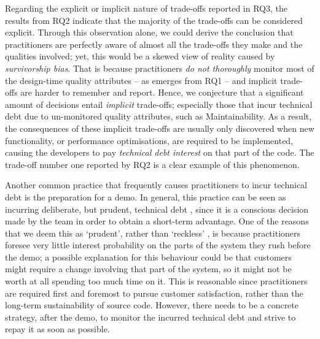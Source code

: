 Regarding the explicit or implicit nature of trade-offs reported in RQ3, the results from RQ2 indicate that the majority of the trade-offs can be considered explicit.
Through this observation alone, we could derive the conclusion that practitioners are perfectly aware of almost all the trade-offs they make and the qualities involved; yet, this would be a skewed view of reality caused by \textit{survivorship bias}. That is because practitioners \textit{do not thoroughly} monitor most of the design-time quality attributes -- as emerges from RQ1 -- and implicit trade-offs are harder to remember and report.
Hence, we conjecture that a significant amount of decisions entail \textit{implicit} trade-offs; especially those that incur technical debt due to un-monitored quality attributes, such as Maintainability.
As a result, the consequences of these implicit trade-offs are usually only discovered when new functionality, or performance optimisations, are required to be implemented, causing the developers to pay \textit{technical debt interest} on that part of the code.
The trade-off number one reported by RQ2 is a clear example of this phenomenon.

Another common practice that frequently causes practitioners to incur technical debt is the preparation for a demo. 
In general, this practice can be seen as incurring deliberate, but prudent, technical debt \cite{Fowler2014}, since it is a conscious decision made by the team in order to obtain a short-term advantage. 
One of the reasons that we deem this as `prudent', rather than `reckless' \cite{Fowler2014}, is because practitioners foresee very little interest probability on the parts of the system they rush before the demo; a possible explanation for this behaviour could be that customers might require a change involving that part of the system, so it might not be worth at all spending too much time on it.
This is reasonable since practitioners are required first and foremost to pursue customer satisfaction, rather than the long-term sustainability of source code. However, there needs to be a concrete strategy, after the demo, to monitor the incurred technical debt and strive to repay it as soon as possible.

